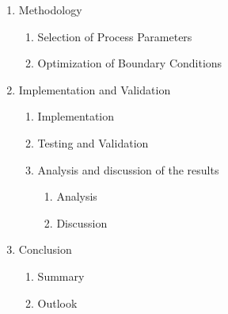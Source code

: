 \documentclass[ZLstudentexpose%
              ,optBiber%
              ,optEnglish%
              ,10pt
              ]{ZLlatex}%
\begin{document}
\begin{enumerate}
	\item Methodology
	\begin{enumerate}
		\item Selection of Process Parameters
		\item Optimization of Boundary Conditions
	\end{enumerate}
	\item Implementation and Validation 
		\begin{enumerate}
			\item Implementation
			\item Testing and Validation 
			\item Analysis and discussion of the results
			\begin{enumerate}
				\item Analysis
				\item Discussion
			\end{enumerate}
		\end{enumerate}
	\item Conclusion
		\begin{enumerate}
			\item Summary
			\item Outlook
		\end{enumerate}
	
\end{enumerate} 
%
\end{document}
